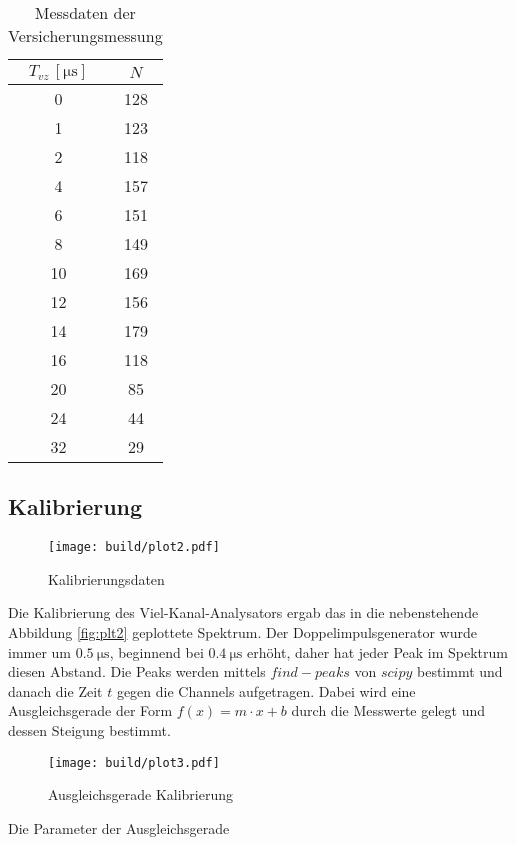 \begin{table}[H]
	\centering
	\begin{tabular}{c c}
		\toprule
		$T_{vz} \, [\unit{\us}]$ & $N $  \\
		\midrule
        0  & 128 \\
        1  & 123 \\
        2  & 118 \\
        4  & 157 \\ 
        6  & 151 \\
        8  & 149 \\
        10 & 169 \\
        12 & 156 \\
        14 & 179 \\
        16 & 118 \\
        20 & 85  \\ 
        24 & 44  \\
        32 & 29  \\
		\bottomrule
	\end{tabular}
    \caption{Messdaten der Versicherungsmessung}
    \label{tab:data1}
\end{table}

\subsection{Kalibrierung}

\begin{wrapfigure}{r}{0.6\textwidth}
	\centering
	\texttt{[image: build/plot2.pdf]}
	\caption{Kalibrierungsdaten}\label{fig:plt2}
\end{wrapfigure}

Die Kalibrierung des Viel-Kanal-Analysators ergab das in die nebenstehende Abbildung \eqref{fig:plt2} geplottete Spektrum. 
Der Doppelimpulsgenerator wurde immer um $\qty{0.5}{\us}$, beginnend bei $\qty{0.4}{\us}$ erhöht, daher hat jeder Peak im Spektrum diesen Abstand.
Die Peaks werden mittels  $find-peaks$ von $scipy$ \cite{scipy} bestimmt und danach die Zeit $t$ gegen die Channels aufgetragen. 
Dabei wird eine Ausgleichsgerade der Form $f(x)=m \cdot x+b$ durch die Messwerte gelegt und dessen Steigung bestimmt. 


\begin{figure}[H]
	\centering
	\texttt{[image: build/plot3.pdf]}
	\caption{Ausgleichsgerade Kalibrierung}\label{fig:plt3}
\end{figure}


Die Parameter der Ausgleichsgerade

